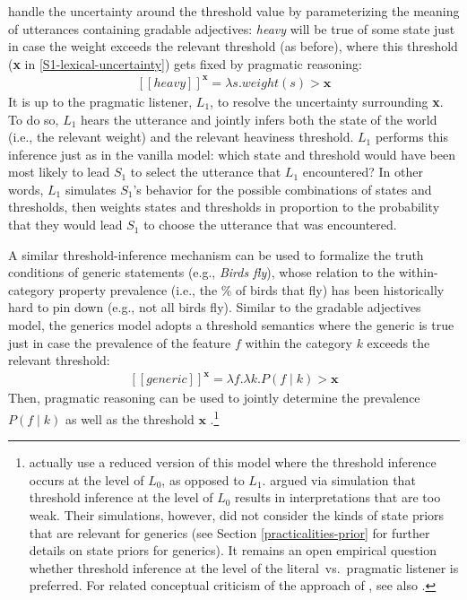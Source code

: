 \documentclass[10pt,letterpaper]{article}
\newcommand{\lam}{\ensuremath{\lambda}}
\newcommand{\sem}[1]{\ensuremath{[\![#1]\!]}}
\begin{document}
\cite{lassitergoodman2013} handle the uncertainty around the threshold value by parameterizing the meaning of utterances containing gradable adjectives: \emph{heavy} will be true of some state just in case the weight exceeds the relevant threshold (as before), where this threshold (\textbf{x} in \eqref{S1-lexical-uncertainty}) gets fixed by pragmatic reasoning:
%
\begin{align}
\label{heavy-sem}
\sem{heavy}^{\textbf{x}} = \lam s. weight(s) > \textbf{x}
\end{align}
%
It is up to the pragmatic listener, $L_1$, to resolve the uncertainty surrounding \textbf{x}. To do so, $L_1$ hears the utterance and jointly infers both the state of the world (i.e., the relevant weight) and the relevant heaviness threshold. $L_1$ performs this inference just as in the vanilla model: which state and threshold would have been most likely to lead $S_1$ to select the utterance that $L_1$ encountered? In other words, $L_1$ simulates $S_1$'s behavior for the possible combinations of states and thresholds, then weights states and thresholds in proportion to the probability that they would lead $S_1$ to choose the utterance that was encountered.

A similar threshold-inference mechanism can be used to formalize the truth conditions of generic statements (e.g., \emph{Birds fly}), whose relation to the within-category property prevalence (i.e., the \% of birds that fly) has been historically hard to pin down (e.g., not all birds fly). 
Similar to the gradable adjectives model, the generics model adopts a threshold semantics where the generic is true just in case the prevalence of the feature $f$ within the category $k$ exceeds the relevant threshold:
%
\begin{align}
\label{generic-sem}
\sem{generic}^{\textbf{x}} = \lam f. \lam k. P(f \mid k) > \textbf{x}
\end{align}
%
Then, pragmatic reasoning can be used to jointly determine the prevalence  $P(f \mid k)$ as well as the threshold $\textbf{x}$ \cite{tesslergoodman2019}.\footnote{
\cite{tesslergoodman2019} actually use a reduced version of this model where the threshold inference occurs at the level of $L_0$, as opposed to $L_1$. \cite{goodmanlassiter2015handbook} argued via simulation that threshold inference at the level of $L_0$ results in interpretations that are too weak.
Their simulations, however, did not consider the kinds of state priors that are relevant for generics (see Section \ref{practicalities-prior} for further details on state priors for generics). 
It remains an open empirical question whether threshold inference at the level of the literal~vs.~pragmatic listener is preferred.
For related conceptual criticism of the approach of \cite{lassiter2017adjectival}, see also \cite{QingFranke2014:Gradable-Adject}.
}
\end{document}
